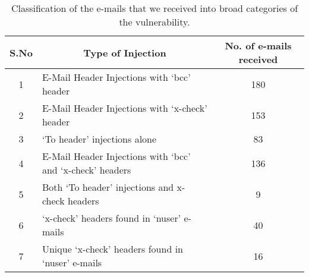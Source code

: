 \begin{table}[!htbp]
	\centering
	\begin{tabular}{|c|l|c|}
		\hline
		\multicolumn{1}{|c|}{\textbf{S.No}} &
		\multicolumn{1}{c|}{\textbf{Type of Injection}} &
		\multicolumn{1}{p{3cm}|}{\centering \textbf{No. of e-mails received}}\\
		\hline
		1 & E-Mail Header Injections with `bcc' header & 180\\
		\hline
		2 & E-Mail Header Injections with `x-check' header & 153\\
		\hline
		3 & `To header' injections alone & 83\\
		\hline
		4 & E-Mail Header Injections with `bcc' and `x-check' headers & 136\\
		\hline
		5 & Both `To header' injections and x-check headers & 9\\
		\hline
		6 & `x-check' headers found in `nuser' e-mails & 40\\
		\hline
		7 & Unique `x-check' headers found in `nuser' e-mails & 16\\
		\hline
	\end{tabular}
	\caption[Analysis of the data]{Classification of the e-mails that we received into broad categories of the vulnerability.}
	\label{tab:analysis}
\end{table}